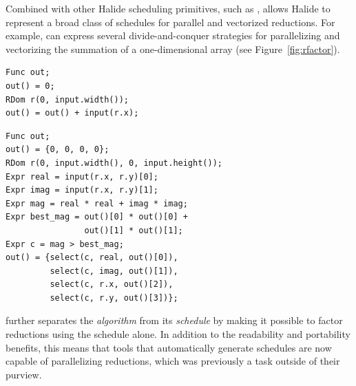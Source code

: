 Combined with other Halide scheduling primitives, such as ,  allows Halide to represent a broad class of schedules for parallel and vectorized reductions. For example,  can express several divide-and-conquer strategies for parallelizing and vectorizing the summation of a one-dimensional array (see Figure~\ref{fig:rfactor}).

\begin{lstlisting}[float,
frame=t,
caption = {Halide sum reduction over a one-dimensional vector.}, label={lst:sum}]
Func out;
out() = 0;
RDom r(0, input.width());
out() = out() + input(r.x);
\end{lstlisting}
\begin{lstlisting}[float,
frame=t,
caption = {Halide reduction which finds the complex number with the greatest magnitude and its location in a two-dimensional array.}, label={lst:complex_magnitude}]
Func out;
out() = {0, 0, 0, 0};
RDom r(0, input.width(), 0, input.height());
Expr real = input(r.x, r.y)[0];
Expr imag = input(r.x, r.y)[1];
Expr mag = real * real + imag * imag;
Expr best_mag = out()[0] * out()[0] +
                out()[1] * out()[1];
Expr c = mag > best_mag;
out() = {select(c, real, out()[0]),
         select(c, imag, out()[1]),
         select(c, r.x, out()[2]),
         select(c, r.y, out()[3])};
\end{lstlisting}

 further separates the \emph{algorithm} from its \emph{schedule} by making it possible to factor reductions using the schedule alone. In addition to the readability and portability benefits, this means that tools that automatically generate schedules \cite{Mullapudi:2016:ASH:2897824.2925952, Ragan-Kelley:2013:HLC:2491956.2462176} are now capable of parallelizing reductions, which was previously a task outside of their purview.


